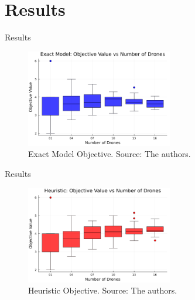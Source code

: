 
\section{Results}

\begin{frame}{Results}

    \begin{figure}[H]
    \centering
    \includegraphics[width=0.57\textwidth]{img/julia_obj_boxplot_vs_drones.png}
    \caption{Exact Model Objective. Source: The authors.}
    \label{fig:exact_model_obj}
\end{figure}

\end{frame}

\begin{frame}{Results}

    \begin{figure}[H]
    \centering
    \includegraphics[width=0.57\textwidth]{img/cpp_obj_boxplot_vs_drones.png}
    \caption{Heuristic Objective. Source: The authors.}
    \label{fig:exact_model_obj}
\end{figure}

\end{frame}

